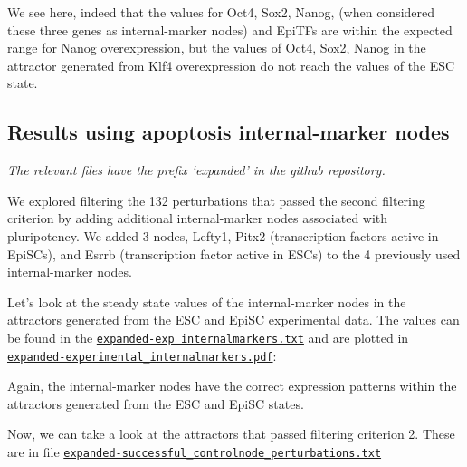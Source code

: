 \documentclass[
]{book}
\newenvironment{Shaded}{\begin{snugshade}}{\end{snugshade}}
\newcommand{\CommentTok}[1]{\textcolor[rgb]{0.56,0.35,0.01}{\textit{#1}}}
\newcommand{\DataTypeTok}[1]{\textcolor[rgb]{0.13,0.29,0.53}{#1}}
\newcommand{\KeywordTok}[1]{\textcolor[rgb]{0.13,0.29,0.53}{\textbf{#1}}}
\newcommand{\NormalTok}[1]{#1}
\newcommand{\StringTok}[1]{\textcolor[rgb]{0.31,0.60,0.02}{#1}}
\begin{document}
We see here, indeed that the values for Oct4, Sox2, Nanog, (when considered these three genes as internal-marker nodes) and EpiTFs are within the expected range for Nanog overexpression, but the values of Oct4, Sox2, Nanog in the attractor generated from Klf4 overexpression do not reach the values of the ESC state.

\hypertarget{results-using-apoptosis-internal-marker-nodes}{%
\subsection{Results using apoptosis internal-marker nodes}\label{results-using-apoptosis-internal-marker-nodes}}

\emph{The relevant files have the prefix `expanded' in the github repository.}

We explored filtering the 132 perturbations that passed the second filtering criterion by adding additional internal-marker nodes associated with pluripotency. We added 3 nodes, Lefty1, Pitx2 (transcription factors active in EpiSCs), and Esrrb (transcription factor active in ESCs) to the 4 previously used internal-marker nodes.

Let's look at the steady state values of the internal-marker nodes in the attractors generated from the ESC and EpiSC experimental data. The values can be found in the \href{https://github.com/VeraLiconaResearchGroup/Netisce/blob/main/ipsc_validation/results/expanded-exp_internalmarkers.txt}{\texttt{expanded-exp\_internalmarkers.txt}} and are plotted in \href{https://github.com/VeraLiconaResearchGroup/Netisce/blob/main/ipsc_validation/results/expanded-experimental_internalmarkers.pdf}{\texttt{expanded-experimental\_internalmarkers.pdf}}:

Again, the internal-marker nodes have the correct expression patterns within the attractors generated from the ESC and EpiSC states.

Now, we can take a look at the attractors that passed filtering criterion 2. These are in file \href{https://github.com/VeraLiconaResearchGroup/Netisce/blob/main/ipsc_validation/results/expanded-successful_controlnode_perturbations.txt}{\texttt{expanded-successful\_controlnode\_perturbations.txt}}

\begin{Shaded}
\end{Shaded}
\end{document}
